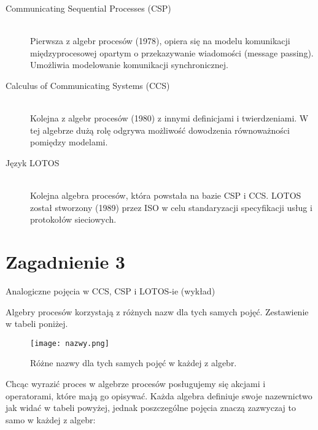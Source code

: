 \documentclass[a4paper,15pt]{article}
\newcommand{\issue}[2]{
    \begin{tcolorbox}[colback=issueColor!5!white,colframe=issueColor,title={Zagadnienie #1}]
        #2
    \end{tcolorbox}
}
\begin{document}
\begin{description}

\item[Communicating Sequential Processes (CSP)] \hfill \\ 
Pierwsza z algebr procesów (1978), opiera się na modelu komunikacji międzyprocesowej opartym o przekazywanie wiadomości (message passing). Umożliwia modelowanie komunikacji synchronicznej.

\item[Calculus of Communicating Systems (CCS)] \hfill \\ 
Kolejna z algebr procesów (1980) z innymi definicjami i twierdzeniami. W tej algebrze dużą rolę odgrywa możliwość dowodzenia równoważności pomiędzy modelami.

\item[Język LOTOS] \hfill \\
Kolejna algebra procesów, która powstała na bazie CSP i CCS. LOTOS został stworzony (1989) przez ISO w celu standaryzacji specyfikacji usług i protokołów sieciowych.  

\end{description}


\newpage
\section{Zagadnienie 3}

\issue{3}{
Analogiczne pojęcia w CCS, CSP i LOTOS-ie (wykład)
}

Algebry procesów korzystają z różnych nazw dla tych samych pojęć. Zestawienie w tabeli poniżej.

\begin{figure}[H]
\centerline{\texttt{[image: nazwy.png]}}
\caption{Różne nazwy dla tych samych pojęć w każdej z algebr.}
\label{fig:twophilo}
\end{figure}


Chcąc wyrazić proces w algebrze procesów posługujemy się akcjami i operatorami, które mają go opisywać. Każda algebra definiuje swoje nazewnictwo jak widać w tabeli powyżej, jednak poszczególne pojęcia znaczą zazwyczaj to samo w każdej z algebr: 
\end{document}
